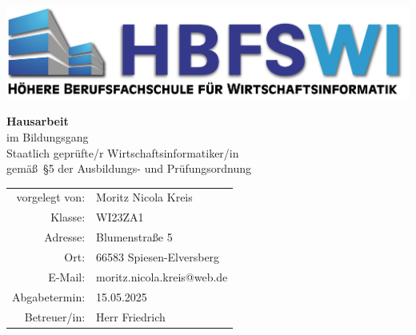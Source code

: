 \documentclass[12pt,a4paper]{article}
\begin{document}
\begin{titlepage}
\centering
\includegraphics[width=1\textwidth]{src/logo.png} \\[1.5cm]

\vspace{1cm}

{\LARGE \textbf{Hausarbeit}} \\
\vspace{0.3cm}
{\large im Bildungsgang \\ \glqq Staatlich geprüfte/r Wirtschaftsinformatiker/in\grqq} \\
\vspace{0.2cm}
{gemä\ss~\S{}5 der Ausbildungs- und Prüfungsordnung} \\
\vspace{2cm}


\vfill

\begin{tabular}{rl}
  vorgelegt von: & Moritz Nicola Kreis \\
  Klasse: & WI23ZA1 \\
  Adresse: & Blumenstraße 5 \\
  Ort: & 66583 Spiesen-Elversberg \\
  E-Mail: & moritz.nicola.kreis@web.de \\
  Abgabetermin: & 15.05.2025 \\
  Betreuer/in: & Herr Friedrich \\
\end{tabular}

\end{titlepage}

\setcounter{page}{1}

\tableofcontents
\newpage

\listoffigures
\newpage

\setcounter{page}{1}
\end{document}
